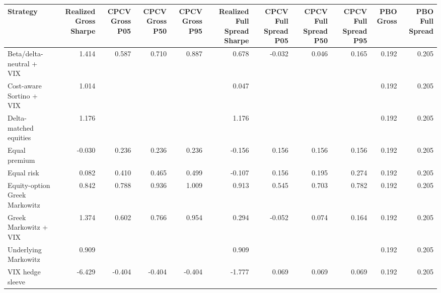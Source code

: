 \begin{tabular}{lrrrrrrrrrr}
\toprule
Strategy & Realized Gross Sharpe & CPCV Gross P05 & CPCV Gross P50 & CPCV Gross P95 & Realized Full Spread Sharpe & CPCV Full Spread P05 & CPCV Full Spread P50 & CPCV Full Spread P95 & PBO Gross & PBO Full Spread \\
\midrule
Beta/delta-neutral + VIX & 1.414 & 0.587 & 0.710 & 0.887 & 0.678 & -0.032 & 0.046 & 0.165 & 0.192 & 0.205 \\
Cost-aware Sortino + VIX & 1.014 &  &  &  & 0.047 &  &  &  & 0.192 & 0.205 \\
Delta-matched equities & 1.176 &  &  &  & 1.176 &  &  &  & 0.192 & 0.205 \\
Equal premium & -0.030 & 0.236 & 0.236 & 0.236 & -0.156 & 0.156 & 0.156 & 0.156 & 0.192 & 0.205 \\
Equal risk & 0.082 & 0.410 & 0.465 & 0.499 & -0.107 & 0.156 & 0.195 & 0.274 & 0.192 & 0.205 \\
Equity-option Greek Markowitz & 0.842 & 0.788 & 0.936 & 1.009 & 0.913 & 0.545 & 0.703 & 0.782 & 0.192 & 0.205 \\
Greek Markowitz + VIX & 1.374 & 0.602 & 0.766 & 0.954 & 0.294 & -0.052 & 0.074 & 0.164 & 0.192 & 0.205 \\
Underlying Markowitz & 0.909 &  &  &  & 0.909 &  &  &  & 0.192 & 0.205 \\
VIX hedge sleeve & -6.429 & -0.404 & -0.404 & -0.404 & -1.777 & 0.069 & 0.069 & 0.069 & 0.192 & 0.205 \\
\bottomrule
\end{tabular}
